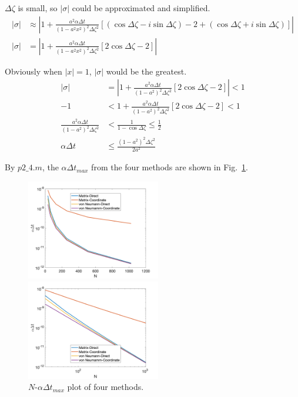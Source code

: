 \documentclass[letterpaper,10pt]{article}
\begin{document}
$\Delta \zeta$ is small, so $|\sigma|$ could be approximated and simplified. 
\begin{align*}
  |\sigma|&\approx |1+\frac{a^2\alpha \Delta t}{(1-a^2x^2)^2\Delta \zeta^2}\left[\left(\cos\Delta\zeta-i\sin\Delta\zeta\right)-2+\left(\cos\Delta\zeta+i\sin\Delta\zeta\right)\right]|\\
  |\sigma|&= |1+\frac{a^2\alpha \Delta t}{(1-a^2x^2)^2\Delta \zeta^2}\left[2\cos\Delta\zeta-2\right]|
\end{align*}

Obviously when $|x|=1$, $|\sigma|$ would be the greatest. 
\begin{align*}
  |\sigma|&= |1+\frac{a^2\alpha \Delta t}{(1-a^2)^2\Delta \zeta^2}\left[2\cos\Delta\zeta-2\right]|<1\\
  -1&<1+\frac{a^2\alpha \Delta t}{(1-a^2)^2\Delta \zeta^2}\left[2\cos\Delta\zeta-2\right]<1\\
  \frac{a^2\alpha \Delta t}{(1-a^2)^2\Delta \zeta^2}&<\frac{1}{1-\cos\Delta\zeta}\leq\frac{1}{2}\\
  \alpha \Delta t &\leq \frac{(1-a^2)^2\Delta \zeta^2}{2a^2}
\end{align*}

By $p2\_4.m$, the $\alpha \Delta t_{max}$ from the four methods are shown in Fig.~\ref{fig2_2}. 
\begin{figure}[h]
  \centering
    \begin{minipage}[t]{0.45\linewidth}
    \centering
    \includegraphics[width=2.3in]{p2_2.png}
    \end{minipage}
    \begin{minipage}[t]{0.45\linewidth}
    \centering
    \includegraphics[width=2.3in]{p2_4.png}
    \end{minipage}
  \caption{$N$-$\alpha \Delta t_{max}$ plot of four methods. }
  \label{fig2_2}
\end{figure}
\end{document}
